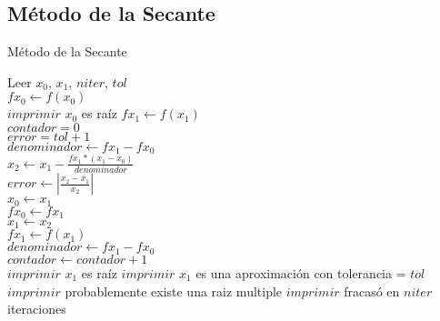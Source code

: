 \documentclass[12pt]{article}
\begin{document}
    \subsection{Método de la Secante}
    \begin{algorithm}[H]
        \caption{Método de la Secante}
        \SetAlgoLined
        Leer $x_0$, $x_1$, $niter$, $tol$\\
        $fx_{0} \leftarrow f(x_{0})$ \\
            {$imprimir$ $x_{0}$ es raíz}
            {
            $fx_{1} \leftarrow f(x_{1})$ \\ 
            $contador = 0$ \\
            $error = tol + 1$ \\
            $denominador \leftarrow fx_{1} - fx_{0}$ \\ 
            {
                $x_{2} \leftarrow x_{1} - \frac{fx_{1} * (x_{1} - x_{0})}{denominador}$ \\
                $error \leftarrow |\frac{x_{2} - x_{1}}{x_{2}}|$ \\
                $x_{0} \leftarrow x_{1}$ \\
                $fx_{0} \leftarrow fx_{1}$ \\
                $x_{1} \leftarrow x_{2}$ \\ 
                $fx_{1} \leftarrow f(x_{1})$\\
                $denominador \leftarrow fx_{1} - fx_{0}$\\
                $contador \leftarrow contador + 1$\\
            }
            {$imprimir$ $x_{1}$ es raíz}
            {$imprimir$ $x_{1}$ es una aproximación con tolerancia = $tol$}
            {$imprimir$ probablemente existe una raiz multiple}
            \Else
            {$imprimir$ fracasó en $niter$ iteraciones}
            }
    \end{algorithm}
\end{document}
